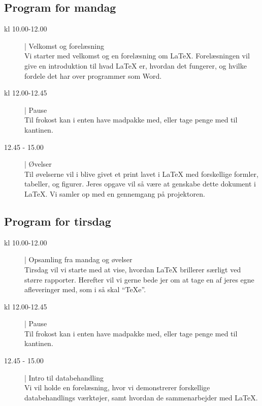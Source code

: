 \documentclass{article}                                                        %
\begin{document}
    \subsection{Program for mandag}
    \begin{description}
        \item[kl 10.00-12.00] | Velkomst og forelæsning ~ \\
        Vi starter med velkomst og en forelæsning om LaTeX.
        Forelæsningen vil give en introduktion til hvad LaTeX er, hvordan det
        fungerer, og hvilke fordele det har over programmer som Word.

        \item[kl 12.00-12.45] | Pause ~ \\
        Til frokost kan i enten have madpakke med, eller tage penge med til
        kantinen.

        \item[12.45 - 15.00] | Øvelser ~ \\
        Til øvelserne vil i blive givet et print lavet i LaTeX med forskellige
        formler, tabeller, og figurer. Jeres opgave vil så være at genskabe
        dette dokument i LaTeX. Vi samler op med en gennemgang på projektoren.
    \end{description}

    \subsection{Program for tirsdag}
    \begin{description}
        \item[kl 10.00-12.00] | Opsamling fra mandag og øvelser ~ \\
        Tirsdag vil vi starte med at vise, hvordan LaTeX brillerer særligt
        ved større rapporter. Herefter vil vi gerne bede jer om at tage en af
        jeres egne afleveringer med, som i så skal ``TeXe''.

        \item[kl 12.00-12.45] | Pause ~ \\
        Til frokost kan i enten have madpakke med, eller tage penge med til
        kantinen.

        \item[12.45 - 15.00] | Intro til databehandling ~ \\
        Vi vil holde en forelæsning, hvor vi demonstrerer forskellige databehandlings
        værktøjer, samt hvordan de sammenarbejder med LaTeX.
    \end{description}
\end{document}
